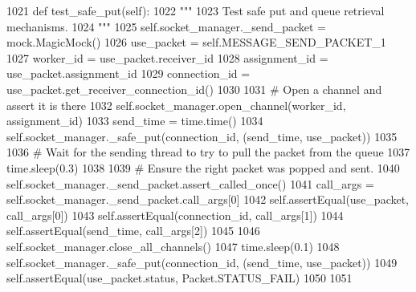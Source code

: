 \begin{DoxyCode}
1021     \textcolor{keyword}{def }test\_safe\_put(self):
1022         \textcolor{stringliteral}{"""}
1023 \textcolor{stringliteral}{        Test safe put and queue retrieval mechanisms.}
1024 \textcolor{stringliteral}{        """}
1025         self.socket\_manager.\_send\_packet = mock.MagicMock()
1026         use\_packet = self.MESSAGE\_SEND\_PACKET\_1
1027         worker\_id = use\_packet.receiver\_id
1028         assignment\_id = use\_packet.assignment\_id
1029         connection\_id = use\_packet.get\_receiver\_connection\_id()
1030 
1031         \textcolor{comment}{# Open a channel and assert it is there}
1032         self.socket\_manager.open\_channel(worker\_id, assignment\_id)
1033         send\_time = time.time()
1034         self.socket\_manager.\_safe\_put(connection\_id, (send\_time, use\_packet))
1035 
1036         \textcolor{comment}{# Wait for the sending thread to try to pull the packet from the queue}
1037         time.sleep(0.3)
1038 
1039         \textcolor{comment}{# Ensure the right packet was popped and sent.}
1040         self.socket\_manager.\_send\_packet.assert\_called\_once()
1041         call\_args = self.socket\_manager.\_send\_packet.call\_args[0]
1042         self.assertEqual(use\_packet, call\_args[0])
1043         self.assertEqual(connection\_id, call\_args[1])
1044         self.assertEqual(send\_time, call\_args[2])
1045 
1046         self.socket\_manager.close\_all\_channels()
1047         time.sleep(0.1)
1048         self.socket\_manager.\_safe\_put(connection\_id, (send\_time, use\_packet))
1049         self.assertEqual(use\_packet.status, Packet.STATUS\_FAIL)
1050 
1051 
\end{DoxyCode}
\mbox{\label{classparlai_1_1mturk_1_1core_1_1legacy__2018_1_1test_1_1test__socket__manager_1_1TestSocketManagerRoutingFunctionality_afab47a6c35aa289de6a5db5d83b40fcf}} 
